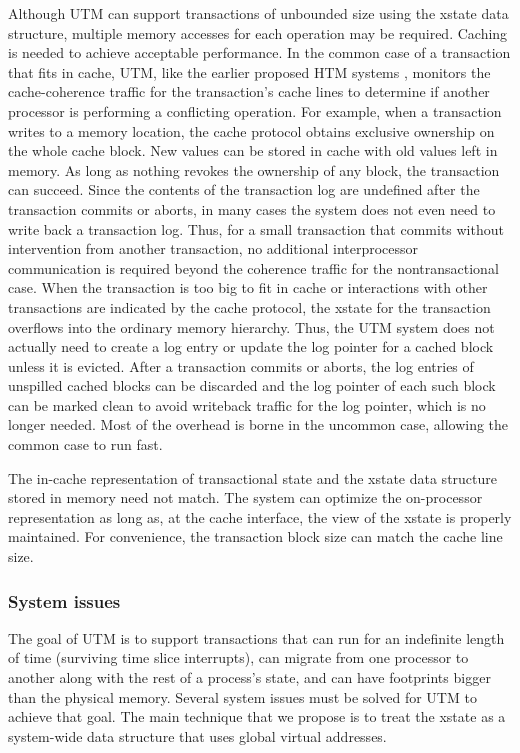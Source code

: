 Although UTM can support transactions of unbounded size using the
xstate data structure, multiple memory accesses for each operation may
be required.  Caching is needed to achieve acceptable performance.  In
the common case of a transaction that fits in cache, UTM, like the
earlier proposed HTM systems \cite{Knight86,HerlihyMo93}, monitors the
cache-coherence traffic for the transaction's cache lines to determine
if another processor is performing a conflicting operation.  For
example, when a transaction writes to a memory location, the cache
protocol obtains exclusive ownership on the whole cache block.  New
values can be stored in cache with old values left in memory.  As long
as nothing revokes the ownership of any block, the transaction can
succeed.  Since the contents of the transaction log are undefined
after the transaction commits or aborts, in many cases the system does
not even need to write back a transaction log.  Thus, for a small
transaction that commits without intervention from another
transaction, no additional interprocessor communication is required
beyond the coherence traffic for the nontransactional case.  When the
transaction is too big to fit in cache or interactions with other
transactions are indicated by the cache protocol, the xstate for the
transaction overflows into the ordinary memory hierarchy.  Thus, the
UTM system does not actually need to create a log entry or update
the log pointer for a cached block unless it is evicted.  After a
transaction commits or aborts, the log entries of unspilled cached
blocks can be discarded and the log pointer of each such block can be
marked clean to avoid writeback traffic for the log pointer, which is
no longer needed.  Most of the overhead is borne in the uncommon case,
allowing the common case to run fast.

The in-cache representation of transactional state and the xstate data
structure stored in memory need not match.  The system can optimize
the on-processor representation as long as, at the cache interface, the
view of the xstate is properly maintained.  For convenience, the
transaction block size can match the cache line size.

\subsubsection{System issues}

The goal of UTM is to support transactions that can run for an
indefinite length of time (surviving time slice interrupts), can
migrate from one processor to another along with the rest of a
process's state, and can have footprints bigger than the physical
memory.  Several system issues must be solved for UTM to achieve that
goal.  The main technique that we propose is to treat the xstate as
a system-wide data structure that uses global virtual addresses.

